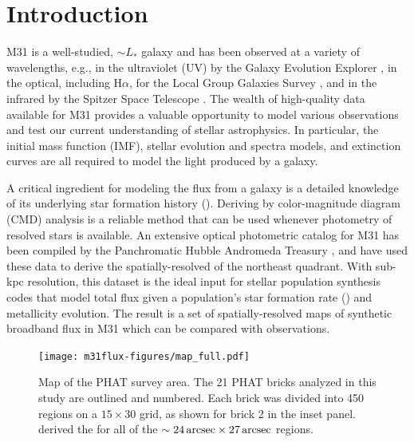 \documentclass[iop, tighten]{emulateapj}
\begin{document}





\section{Introduction}

M31 is a well-studied, $\sim L_\ast$ galaxy and has been observed at a variety
of wavelengths, e.g., in the ultraviolet (UV) by the Galaxy Evolution Explorer
\citep[GALEX;][]{Morrissey:2007}, in the optical, including H$\alpha$, for the
Local Group Galaxies Survey \citep{Massey:2006}, and in the infrared by the
Spitzer Space Telescope \citep{Gordon:2006}. The wealth of high-quality data
available for M31 provides a valuable opportunity to model various observations
and test our current understanding of stellar astrophysics. In particular, the
initial mass function (IMF), stellar evolution and spectra models, and
extinction curves are all required to model the light produced by a galaxy.

A critical ingredient for modeling the flux from a galaxy is a detailed
knowledge of its underlying star formation history (\sfh{}). Deriving 
by color-magnitude diagram (CMD) analysis is a reliable method that can be used
whenever photometry of resolved stars is available. An extensive optical
photometric catalog for M31 has been compiled by the Panchromatic Hubble
Andromeda Treasury \citep[PHAT][]{Dalcanton:2012}, and \citet{Lewis:2014} have
used these data to derive the spatially-resolved \sfh{} of the northeast
quadrant. With sub-kpc resolution, this \sfh{} dataset is the ideal input for
stellar population synthesis codes that model total flux given a population's
star formation rate (\sfr{}) and metallicity evolution. The result is a set of
spatially-resolved maps of synthetic broadband flux in M31 which can be
compared with observations.


\begin{figure}
\centering
\texttt{[image: m31flux-figures/map\_full.pdf]}
\caption[PHAT survey map.]{Map of the PHAT survey area. The 21 PHAT bricks
    analyzed in this study are outlined and numbered. Each brick was divided
    into 450 regions on a $15 \times 30$ grid, as shown for brick 2 in the
    inset panel. \citet{Lewis:2014} derived the  for all of the $\sim
    24\,\mathrm{arcsec} \times 27\,\mathrm{arcsec}$ regions.
}
\label{fig:mfx:map}
\end{figure}
\end{document}
